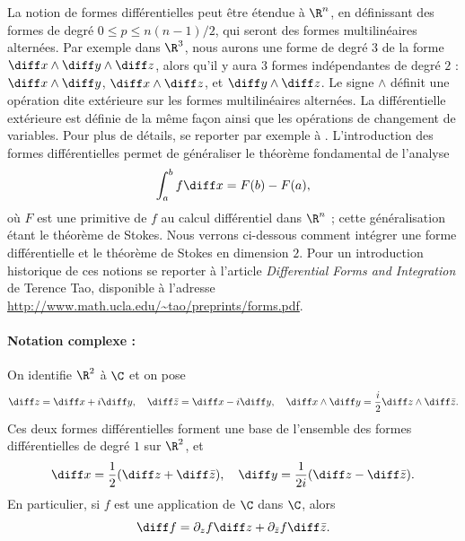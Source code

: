 
\begin{rem} La notion de formes différentielles peut être étendue à $\R^n$, en définissant des formes de degré $0 \leq p \leq n(n-1)/2$, qui seront des formes multilinéaires alternées. Par exemple dans $\R^3$, nous aurons une forme de degré $3$ de la forme $\diff x \wedge \diff y \wedge \diff z$, alors qu'il y aura $3$ formes indépendantes de degré $2$ :  $\diff x \wedge \diff y$,  $\diff x \wedge \diff z$, et $\diff y \wedge \diff z$. Le signe $\wedge$ définit une opération dite extérieure sur les formes multilinéaires alternées. La différentielle extérieure est définie de la même façon ainsi que les opérations de changement de variables. Pour plus de détails, se reporter par exemple à \cite{cartan1977}. L'introduction des formes différentielles permet de généraliser le théorème fondamental de l'analyse
\[\int_a^b f \diff x = F(b)-F(a),\]
où $F$ est une primitive de $f$ au calcul différentiel dans $\R^n$ ; cette généralisation étant le théorème de Stokes. Nous verrons ci-dessous comment intégrer une forme différentielle et le théorème de Stokes en dimension $2$. Pour un introduction historique de ces notions se reporter à l'article \emph{Differential Forms and Integration} de Terence Tao, disponible à l'adresse \url{http://www.math.ucla.edu/~tao/preprints/forms.pdf}.
\end{rem}

\paragraph{Notation complexe :} On identifie $\R^2$ à $\C$ et on pose
\[\diff z =\diff x + i \diff y, \quad \diff \bar{z} = \diff x - i \diff y, \quad \diff x \wedge \diff y = \frac{i}{2} \diff z \wedge \diff \bar{z}.\]
Ces deux formes différentielles forment une base de l'ensemble des formes différentielles de degré $1$ sur $\R^2$, et 
\[\diff x = \frac{1}{2}( \diff z + \diff \bar{z}), \quad \diff y = \frac{1}{2 i }( \diff z - \diff \bar{z}).\]
En particulier, si $f$ est une application de $\C$ dans $\C$, alors
\[\diff f = \partial_z f \diff z + \partial_{\bar{z}} f \diff \bar{z}.\]

